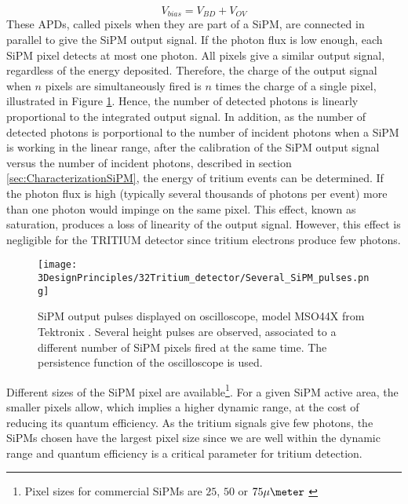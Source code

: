 \begin{equation}
V_{bias}=V_{BD}+V_{OV}
\label{overvoltage}
\end{equation}
These APDs, called pixels when they are part of a SiPM, are connected in parallel to give the SiPM output signal. If the photon flux is low enough, each SiPM pixel detects at most one photon. All pixels give a similar output signal, regardless of the energy deposited. Therefore, the charge of the output signal when $n$ pixels are simultaneously fired is $n$ times the charge of a single pixel, illustrated in Figure \ref{fig:PulsesOfSiPM}. Hence, the number of detected photons is linearly proportional to the integrated output signal. In addition, as the number of detected photons is porportional to the number of incident photons when a SiPM is working in the linear range, after the calibration of the SiPM output signal versus the number of incident photons, described in section \ref{sec:CharacterizationSiPM}, the energy of tritium events can be determined. If the photon flux is high (typically several thousands of photons per event) more than one photon would impinge on the same pixel. This effect, known as saturation, produces a loss of linearity of the output signal. However, this effect is negligible for the TRITIUM detector since tritium electrons produce few photons. %

\begin{figure}[h]
\centering
\texttt{[image: 3DesignPrinciples/32Tritium\_detector/Several\_SiPM\_pulses.png]}
\caption{SiPM output pulses displayed on oscilloscope, model MSO44X from Tektronix \cite{Oscilloscope}. Several height pulses are observed, associated to a different number of  SiPM pixels fired at the same time. The persistence function of the oscilloscope is used.\label{fig:PulsesOfSiPM}}
\end{figure}

Different sizes of the SiPM pixel are available\footnote{Pixel sizes for commercial SiPMs are $25$, $50$ or $75\mu\meter$ \cite{DataSheetHammamatsu_1_SiPM_25, DataSheetHammamatsu_1_SiPM_50, DataSheetHammamatsu_1_SiPM_75}}. For a given SiPM active area, the smaller pixels allow, which implies a higher dynamic range, at the cost of reducing its quantum efficiency. As the tritium signals give few photons, the SiPMs chosen have the largest pixel size since we are well within the dynamic range and quantum efficiency is a critical parameter for tritium detection.

